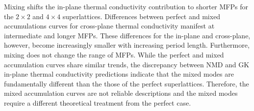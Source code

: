 \documentclass[aps,prb,preprint,preprintnumbers,amsmath,amssymb,floatfix,superscriptaddress]{revtex4}
\begin{document}
Mixing shifts the in-plane thermal conductivity contribution to shorter MFPs for the $2 \times 2 $ and $4 \times 4 $ superlattices. Differences between perfect and mixed accumulations curves for cross-plane thermal conductivity manifest at intermediate and longer MFPs. These differences for the in-plane and cross-plane, however, become increasingly smaller with increasing period length. Furthermore, mixing does not change the range of MFPs. While the perfect and mixed accumulation curves share similar trends, the discrepancy between NMD and GK in-plane thermal conductivity predictions indicate that the mixed modes are fundamentally different than the those of the perfect superlattices. Therefore, the mixed accumulation curves are not reliable descriptions and the mixed modes require a different theoretical treatment from the perfect case.



\end{document}
